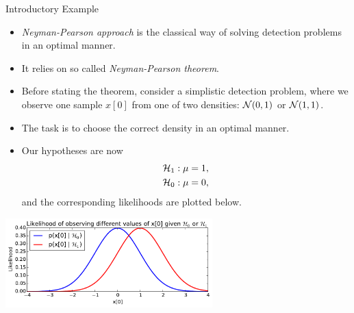 \documentclass[10pt, aspectratio=169]{beamer} %
\begin{document}
\begin{frame}[allowframebreaks=0.8]
 {Introductory Example}
\begin{itemize}
\item \emph{Neyman-Pearson approach} is the classical way of solving 
detection problems in an optimal manner. 
\item It relies on so called \emph{Neyman-Pearson theorem}.
\item Before stating the theorem, consider a simplistic detection
problem, where we observe one sample $x[0]$ from one of two
densities: ${\cal N}(0,1)$ or ${\cal N}(1,1)$. 
\item The task is to choose the correct density in an optimal manner.
\item Our hypotheses are now
\begin{align*}
{\cal H}_1 &: \mu = 1,\\
{\cal H}_0 &: \mu = 0,
\end{align*}
and the corresponding likelihoods are plotted below.

\end{itemize}
\centerline{\includegraphics[width=0.6\textwidth]{NeymanPearson.pdf}}

\begin{itemize}


\end{itemize}
\end{frame}
\end{document}
